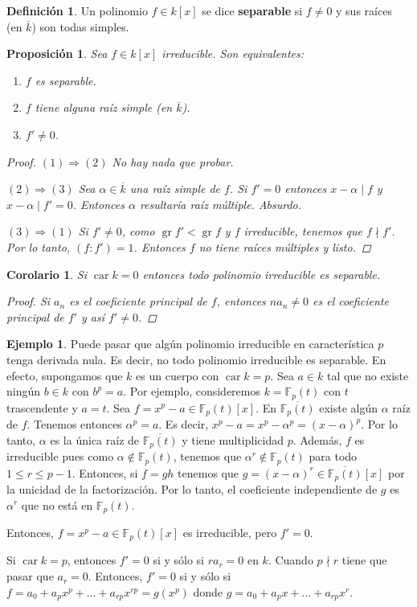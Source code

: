 \documentclass[12pt]{book}
\newtheorem{prop}[teo]{Proposición}
\newtheorem{cor}[teo]{Corolario}
\theoremstyle{definition}
\newtheorem{defn}[teo]{Definición}
\newtheorem{ex}[teo]{Ejemplo}
\newcommand{\FF}{\mathbb{F}}
\DeclareMathOperator{\gr}{gr}
\DeclareMathOperator{\car}{car}
\begin{document}
\begin{defn}
Un polinomio $f\in k[x]$ se dice \textbf{separable} si $f\neq 0$ y sus raíces (en $\overline{k}$) son todas simples.
\end{defn}

\begin{prop}
Sea $f\in k[x]$ irreducible. Son equivalentes:
\begin{enumerate}
\item $f$ es separable.
\item $f$ tiene alguna raíz simple (en $\overline{k}$).
\item $f'\neq 0$.
\end{enumerate}
\begin{proof}
$(1)\Longrightarrow(2)$ No hay nada que probar.

$(2)\Longrightarrow(3)$ Sea $\alpha\in\overline{k}$ una raíz simple de $f$. Si $f' = 0$ entonces $x-\alpha\mid f$ y $x-\alpha\mid f'=0$. Entonces $\alpha$ resultaría raíz múltiple. Absurdo.

$(3)\Longrightarrow(1)$ Si $f'\neq 0$, como $\gr f'< \gr f$ y $f$ irreducible, tenemos que $f\nmid f'$. Por lo tanto, $(f:f')=1$. Entonces $f$ no tiene raíces múltiples y listo.
\end{proof}
\end{prop}

\begin{cor}
Si $\car k = 0$ entonces todo polinomio irreducible es separable.
\begin{proof}
Si $a_n$ es el coeficiente principal de $f$, entonces $na_n\neq 0$ es el coeficiente principal de $f'$ y así $f'\neq 0$.
\end{proof}
\end{cor}

\begin{ex}
Puede pasar que algún polinomio irreducible en característica $p$ tenga derivada nula. Es decir, no todo polinomio irreducible es separable. En efecto, supongamos que $k$ es un cuerpo con $\car k = p$. Sea $a\in k$ tal que no existe ningún $b\in k$ con $b^p = a$. Por ejemplo, consideremos $k=\FF_p(t)$ con $t$ trascendente y $a=t$. Sea $f = x^p - a\in \FF_p(t)[x]$. En $\overline{\FF_p(t)}$ existe algún $\alpha$ raíz de $f$. Tenemos entonces $\alpha^p = a$. Es decir, $x^p - a = x^p - \alpha^p = (x-\alpha)^p$. Por lo tanto, $\alpha$ es la única raíz de $\overline{\FF_p(t)}$ y tiene multiplicidad $p$. Además, $f$ es irreducible pues como $\alpha\notin \FF_p(t)$, tenemos que $\alpha^r \notin \FF_p(t)$ para todo $1\leq r \leq p-1$. Entonces, si $f=gh$ tenemos que $g= (x-\alpha)^r\in\overline{\FF_p(t)}[x]$ por la unicidad de la factorización. Por lo tanto, el coeficiente independiente de $g$ es $\alpha^r$ que no está en $\FF_p(t)$.

Entonces, $f=x^p - a\in \FF_p(t)[x]$ es irreducible, pero $f' = 0$.

Si $\car k = p$, entonces $f'=0$ si y sólo si $ra_r = 0$ en $k$. Cuando $p\nmid r$ tiene que pasar que $a_r=0$. Entonces, $f'=0$ si y sólo si $f = a_0 + a_p x^p + \ldots + a_{rp}x^{rp} = g(x^p)$ donde  $g = a_0 + a_p x + \ldots + a_{rp}x^r$.
\end{ex}
\end{document}
